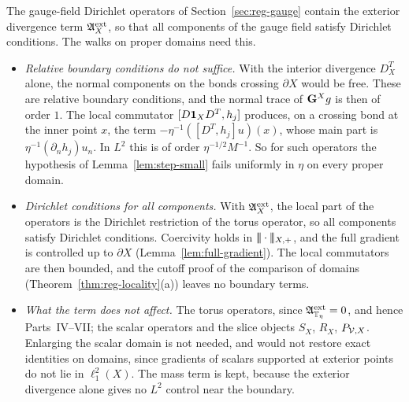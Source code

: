 \begin{remark}\label{rem:L3-domains}
The gauge-field Dirichlet operators of Section~\ref{sec:reg-gauge} contain the exterior divergence term $\mathfrak A^{\rm ext}_X$, so that all components of the gauge field satisfy Dirichlet conditions. The walks on proper domains need this.
\begin{itemize}
\item \emph{Relative boundary conditions do not suffice.} With the interior divergence $D^T_X$ alone, the normal components on the bonds crossing $\partial X$ would be free. These are relative boundary conditions, and the normal trace of $\mathbf G^Xg$ is then of order $1$. The local commutator $[D\mathbf 1_XD^T,h_j]$ produces, on a crossing bond at the inner point $x$, the term $-\eta^{-1}([D^T,h_j]u)(x)$, whose main part is $\eta^{-1}(\partial_nh_j)u_n$. In $L^2$ this is of order $\eta^{-1/2}M^{-1}$. So for such operators the hypothesis of Lemma~\ref{lem:step-small} fails uniformly in $\eta$ on every proper domain.
\item \emph{Dirichlet conditions for all components.} With $\mathfrak A^{\rm ext}_X$, the local part of the operators is the Dirichlet restriction of the torus operator, so all components satisfy Dirichlet conditions. Coercivity holds in $|\!|\!|\cdot|\!|\!|_{X,+}$, and the full gradient is controlled up to $\partial X$ (Lemma~\ref{lem:full-gradient}). The local commutators are then bounded, and the cutoff proof of the comparison of domains (Theorem~\ref{thm:reg-locality}(a)) leaves no boundary terms.
\item \emph{What the term does not affect.} The torus operators, since $\mathfrak A^{\rm ext}_{\mathbb T_\eta}=0$, and hence Parts~IV--VII; the scalar operators and the slice objects $S_X$, $R_X$, $P_{\mathcal V,X}$. Enlarging the scalar domain is not needed, and would not restore exact identities on domains, since gradients of scalars supported at exterior points do not lie in $\ell^2_1(X)$. The mass term is kept, because the exterior divergence alone gives no $L^2$ control near the boundary.
\end{itemize}
\end{remark}

